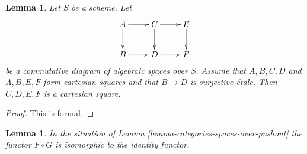 \documentclass{stacks-project}
\theoremstyle{plain}
\newtheorem{lemma}[subsection]{Lemma}
\theoremstyle{definition}
\theoremstyle{remark}
\numberwithin{equation}{subsection}
\begin{document}
\begin{lemma}
\label{lemma-diagram}
Let $S$ be a scheme. Let
$$
\xymatrix{
A \ar[r] \ar[d] & C \ar[d] \ar[r] & E \ar[d] \\
B \ar[r] & D \ar[r] & F
}
$$
be a commutative diagram of algebraic spaces over $S$.
Assume that $A, B, C, D$ and $A, B, E, F$ form cartesian squares
and that $B \to D$ is surjective \'etale.
Then $C, D, E, F$ is a cartesian square.
\end{lemma}

\begin{proof}
This is formal.
\end{proof}

\begin{lemma}
\label{lemma-equivalence-categories-spaces-over-pushout}
In the situation of Lemma \ref{lemma-categories-spaces-over-pushout}
the functor $F \circ G$ is isomorphic to the identity functor.
\end{lemma}
\end{document}
